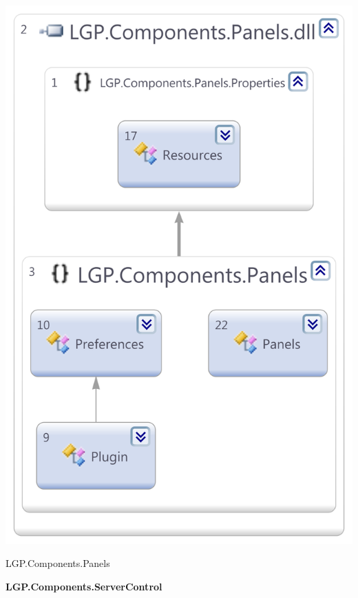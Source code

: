 \begin{multicols}{2}
			\begin{figurehere}
				\centering
				\includegraphics[scale=0.30]{pages/appendix3/figures/dllscreens/panels.png}
				\caption{LGP.Components.Panels}
			\end{figurehere}			
			
		\large{\bfseries{LGP.Components.ServerControl}}
		\vspace{5mm}
		

\end{multicols}

